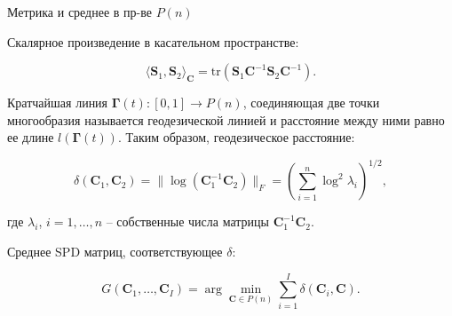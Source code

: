 \documentclass{beamer}
\begin{document}
\begin{frame}{Метрика и среднее в пр-ве $P(n)$}

\small

Скалярное произведение в касательном пространстве:

\begin{equation*}
    \langle \mathbf{S}_1, \mathbf{S}_2 \rangle_{\mathbf{C}} = \text{tr}(\mathbf{S}_1\mathbf{C}^{-1}\mathbf{S}_2\mathbf{C}^{-1}).
\end{equation*}

Кратчайшая линия $\mathbf{\Gamma}(t) : [0, 1] \rightarrow P(n)$, соединяющая две точки многообразия называется геодезической линией и расстояние между ними равно ее длине $l(\mathbf{\Gamma}(t))$. Таким образом, геодезическое расстояние:

\begin{equation*}
    \delta(\mathbf{C}_1, \mathbf{C}_2) = \|\log (\mathbf{C}_1^{-1}\mathbf{C}_2)\|_F = \left(\sum\limits_{i = 1}^n \log ^2 \lambda_i\right)^{1/2},
\end{equation*}

где $\lambda_i$, $i = 1, \ldots, n$ -- собственные числа матрицы $\mathbf{C}_1^{-1}\mathbf{C}_2$.

Среднее SPD матриц, соответствующее $\delta$:

\begin{equation*}
    G(\mathbf{C}_1, \ldots, \mathbf{C}_I) = \arg \min \limits_{\mathbf{C} \in P(n)} \sum\limits_{i = 1}^I \delta(\mathbf{C}_i, \mathbf{C}).
\end{equation*}

\end{frame}
\end{document}
